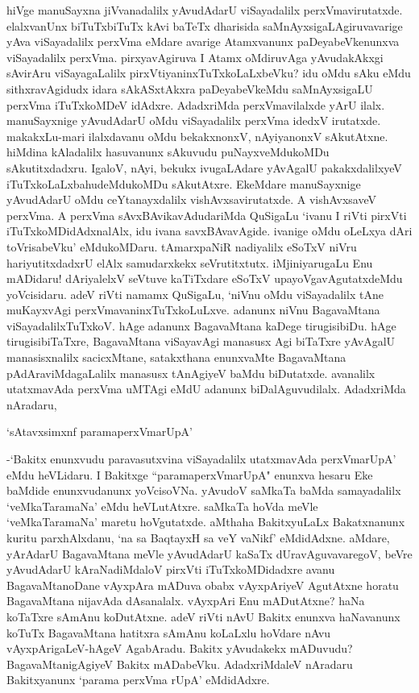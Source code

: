 hiVge manuSayxna jiVvanadalilx yAvudAdarU viSayadalilx perxVmavirutatxde. elalxvanUnx biTuTxbiTuTx kAvi baTeTx dharisida saMnAyxsigaLAgiruvavarige yAva viSayadalilx perxVma eMdare 
avarige Atamxvanunx paDeyabeVkenunxva viSayadalilx perxVma. pirxyavAgiruva I Atamx oMdiruvAga yAvudakAkxgi sAvirAru viSayagaLalilx 
pirxVtiyaninxTuTxkoLaLxbeVku? idu oMdu sAku eMdu sithxravAgidudx idara sAkASxtAkxra paDeyabeVkeMdu saMnAyxsigaLU perxVma iTuTxkoMDeV idAdxre. AdadxriMda perxVmavilalxde yArU ilalx. manuSayxnige yAvudAdarU oMdu viSayadalilx perxVma idedxV irutatxde. makakxLu-mari ilalxdavanu oMdu bekakxnonxV, nAyiyanonxV sAkutAtxne. hiMdina kAladalilx hasuvanunx sAkuvudu puNayxveMdukoMDu sAkutitxdadxru. IgaloV, nAyi, bekukx ivugaLAdare yAvAgalU pakakxdalilxyeV iTuTxkoLaLxbahudeMdukoMDu sAkutAtxre. EkeMdare manuSayxnige yAvudAdarU oMdu ceYtanayxdalilx vishAvxsavirutatxde. A vishAvxsaveV perxVma. A perxVma sAvxBAvikavAdudariMda QuSigaLu `ivanu I riVti pirxVti iTuTxkoMDidAdxnalAlx, idu ivana savxBAvavAgide. ivanige oMdu oLeLxya dAri toVrisabeVku' eMdukoMDaru. tAmarxpaNiR nadiyalilx eSoTxV niVru hariyutitxdadxrU elAlx samudarxkekx seVrutitxtutx. iMjiniyarugaLu Enu mADidaru! dAriyalelxV seVtuve kaTiTxdare eSoTxV upayoVgavAgutatxdeMdu yoVcisidaru. adeV riVti namamx QuSigaLu, `niVnu oMdu viSayadalilx tAne muKayxvAgi perxVmavaninxTuTxkoLuLxve. adanunx niVnu BagavaMtana viSayadalilxTuTxkoV. hAge adanunx BagavaMtana kaDege tirugisibiDu. hAge tirugisibiTaTxre, BagavaMtana viSayavAgi manasusx Agi biTaTxre yAvAgalU manasisxnalilx sacicxMtane, satakxthana enunxvaMte BagavaMtana pAdAraviMdagaLalilx manasusx tAnAgiyeV baMdu biDutatxde. avanalilx utatxmavAda perxVma uMTAgi eMdU adanunx biDalAguvudilalx. AdadxriMda nAradaru, 

\begin{shloka}
`sAtavxsimxnf paramaperxVmarUpA'
\end{shloka}

-`Bakitx enunxvudu paravasutxvina viSayadalilx utatxmavAda perxVmarUpA' eMdu heVLidaru. I Bakitxge ``paramaperxVmarUpA" enunxva hesaru Eke baMdide 
enunxvudanunx yoVcisoVNa. yAvudoV saMkaTa baMda samayadalilx `veMkaTaramaNa' eMdu heVLutAtxre. saMkaTa hoVda meVle `veMkaTaramaNa' 
maretu hoVgutatxde. aMthaha BakitxyuLaLx Bakatxnanunx kuritu parxhAlxdanu, `na sa BaqtayxH sa veY vaNikf' eMdidAdxne. aMdare, yArAdarU BagavaMtana meVle yAvudAdarU 
kaSaTx dUravAguvavaregoV, beVre yAvudAdarU kAraNadiMdaloV pirxVti iTuTxkoMDidadxre avanu BagavaMtanoDane vAyxpAra mADuva obabx vAyxpAriyeV 
AgutAtxne horatu BagavaMtana nijavAda dAsanalalx. vAyxpAri Enu mADutAtxne? haNa koTaTxre sAmAnu koDutAtxne. adeV riVti nAvU Bakitx enunxva 
haNavanunx koTuTx BagavaMtana hatitxra sAmAnu koLaLxlu hoVdare nAvu vAyxpArigaLeV-hAgeV AgabAradu. Bakitx yAvudakekx mADuvudu? 
BagavaMtanigAgiyeV Bakitx mADabeVku. AdadxriMdaleV nAradaru Bakitxyanunx `parama perxVma rUpA' eMdidAdxre.

